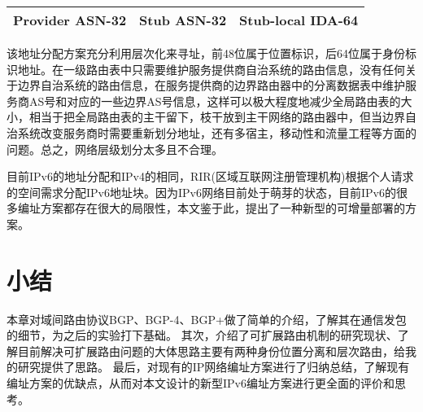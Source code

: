 \begin{itemize}
\begin{itemize}
\begin{table}[h]
\begin{tabular}{|c|c|c|}
        Provider ASN-32 & Stub ASN-32 & Stub-local IDA-64\\
        \hline
        \end{tabular}
    \end{table}
    该地址分配方案充分利用层次化来寻址，前48位属于位置标识，后64位属于身份标识地址。在一级路由表中只需要维护服务提供商自治系统的路由信息，没有任何关于边界自治系统的路由信息，在服务提供商的边界路由器中的分离数据表中维护服务商AS号和对应的一些边界AS号信息，这样可以极大程度地减少全局路由表的大小，相当于把全局路由表的主干留下，枝干放到主干网络的路由器中，但当边界自治系统改变服务商时需要重新划分地址，还有多宿主，移动性和流量工程等方面的问题。总之，网络层级划分太多且不合理。
    \end{itemize}
    
\end{itemize}

目前IPv6的地址分配和IPv4的相同，RIR(区域互联网注册管理机构)根据个人请求的空间需求分配IPv6地址块。因为IPv6网络目前处于萌芽的状态，目前IPv6的很多编址方案都存在很大的局限性，本文鉴于此，提出了一种新型的可增量部署的方案。

\section{小结}
本章对域间路由协议BGP、BGP-4、BGP+做了简单的介绍，了解其在通信发包的细节，为之后的实验打下基础。
其次，介绍了可扩展路由机制的研究现状、了解目前解决可扩展路由问题的大体思路主要有两种身份位置分离和层次路由，给我的研究提供了思路。
最后，对现有的IP网络编址方案进行了归纳总结，了解现有编址方案的优缺点，从而对本文设计的新型IPv6编址方案进行更全面的评价和思考。

